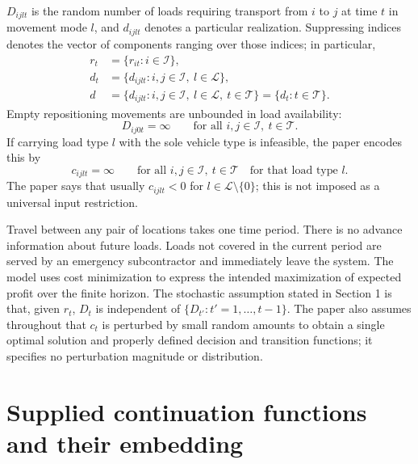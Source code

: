\documentclass{article}
\begin{document}
$D_{ijlt}$ is the random number of loads requiring transport from $i$ to $j$ at time $t$ in movement mode $l$, and $d_{ijlt}$ denotes a particular realization. Suppressing indices denotes the vector of components ranging over those indices; in particular,
\[
\begin{aligned}
r_t&=\{r_{it}:i\in\mathcal I\},\\
d_t&=\{d_{ijlt}:i,j\in\mathcal I,\ l\in\mathcal L\},\\
d&=\{d_{ijlt}:i,j\in\mathcal I,\ l\in\mathcal L,\ t\in\mathcal T\}
  =\{d_t:t\in\mathcal T\}.
\end{aligned}
\]
Empty repositioning movements are unbounded in load availability:
\[
D_{ij0t}=\infty
\qquad\text{for all }i,j\in\mathcal I,\ t\in\mathcal T.
\]
If carrying load type $l$ with the sole vehicle type is infeasible, the paper encodes this by
\[
c_{ijlt}=\infty
\qquad\text{for all }i,j\in\mathcal I,\ t\in\mathcal T
\quad\text{for that load type }l.
\]
The paper says that usually $c_{ijlt}<0$ for $l\in\mathcal L\setminus\{0\}$; this is not imposed as a universal input restriction.

Travel between any pair of locations takes one time period. There is no advance information about future loads. Loads not covered in the current period are served by an emergency subcontractor and immediately leave the system. The model uses cost minimization to express the intended maximization of expected profit over the finite horizon. The stochastic assumption stated in Section 1 is that, given $r_t$, $D_t$ is independent of $\{D_{t'}:t'=1,\ldots,t-1\}$. The paper also assumes throughout that $c_t$ is perturbed by small random amounts to obtain a single optimal solution and properly defined decision and transition functions; it specifies no perturbation magnitude or distribution.

\section*{Supplied continuation functions and their embedding}
\end{document}
